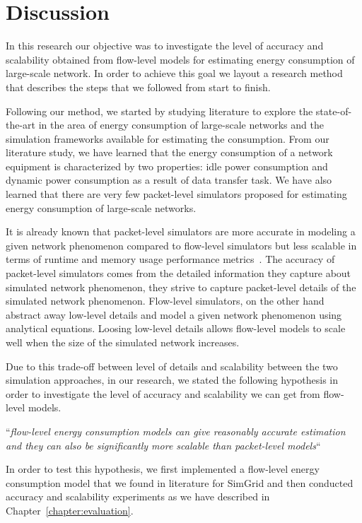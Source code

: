 \chapter{Discussion}
\label{chapter:discussion}

In this research our objective was to investigate the level of accuracy and scalability obtained from flow-level models for estimating energy consumption of large-scale network. In order to achieve this goal we layout a research method that describes the steps that we followed from start to finish. 

Following our method, we started by studying literature to explore the state-of-the-art in the area of energy consumption of large-scale networks and the simulation frameworks available for estimating the consumption. From our literature study, we have learned that the energy consumption of a network equipment is characterized by two properties: idle power consumption and dynamic power consumption as a result of data transfer task. We have also learned that there are very few packet-level simulators proposed for estimating energy consumption of large-scale networks.

It is already known that packet-level simulators are more accurate in modeling a given network phenomenon compared to flow-level simulators but less scalable in terms of runtime and memory usage performance metrics~\cite{DBLP:conf/infocom/LiuFGKT01}. The accuracy of packet-level simulators comes from the detailed information they capture about simulated network phenomenon, they strive to capture packet-level details of the simulated network phenomenon. Flow-level simulators, on the other hand abstract away low-level details and model a given network phenomenon using analytical equations. Loosing low-level details allows flow-level models to scale well when the size of the simulated network increases. 

Due to this trade-off between level of details and scalability between the two simulation approaches, in our research, we stated the following hypothesis in order to investigate the level of accuracy and scalability we can get from flow-level models.

``\emph{flow-level energy consumption models can give reasonably accurate estimation and they can also be significantly more scalable than packet-level models}``

In order to test this hypothesis, we first implemented a flow-level energy consumption model that we found in literature for SimGrid and then conducted accuracy and scalability experiments as we have described in Chapter~\ref{chapter:evaluation}. 

